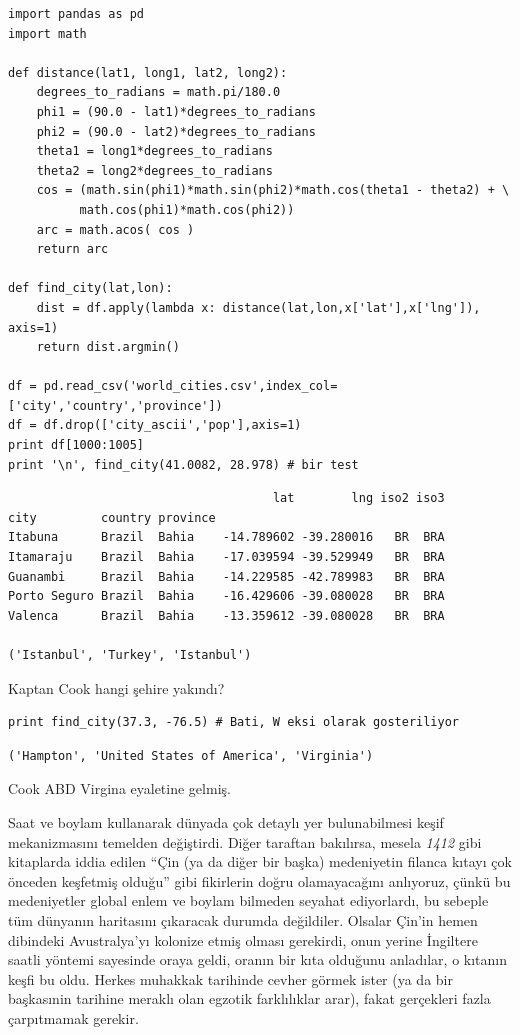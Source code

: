 \documentclass[12pt,fleqn]{article}\usepackage{../../common}
\begin{document}
\begin{verbatim}
import pandas as pd
import math

def distance(lat1, long1, lat2, long2):
    degrees_to_radians = math.pi/180.0
    phi1 = (90.0 - lat1)*degrees_to_radians
    phi2 = (90.0 - lat2)*degrees_to_radians
    theta1 = long1*degrees_to_radians
    theta2 = long2*degrees_to_radians
    cos = (math.sin(phi1)*math.sin(phi2)*math.cos(theta1 - theta2) + \
          math.cos(phi1)*math.cos(phi2)) 
    arc = math.acos( cos )
    return arc
    
def find_city(lat,lon):
    dist = df.apply(lambda x: distance(lat,lon,x['lat'],x['lng']), axis=1)
    return dist.argmin()

df = pd.read_csv('world_cities.csv',index_col=['city','country','province'])
df = df.drop(['city_ascii','pop'],axis=1)
print df[1000:1005]
print '\n', find_city(41.0082, 28.978) # bir test
\end{verbatim}

\begin{verbatim}
                                     lat        lng iso2 iso3
city         country province                                
Itabuna      Brazil  Bahia    -14.789602 -39.280016   BR  BRA
Itamaraju    Brazil  Bahia    -17.039594 -39.529949   BR  BRA
Guanambi     Brazil  Bahia    -14.229585 -42.789983   BR  BRA
Porto Seguro Brazil  Bahia    -16.429606 -39.080028   BR  BRA
Valenca      Brazil  Bahia    -13.359612 -39.080028   BR  BRA

('Istanbul', 'Turkey', 'Istanbul')
\end{verbatim}

Kaptan Cook hangi şehire yakındı? 

\begin{verbatim}
print find_city(37.3, -76.5) # Bati, W eksi olarak gosteriliyor
\end{verbatim}

\begin{verbatim}
('Hampton', 'United States of America', 'Virginia')
\end{verbatim}

Cook ABD Virgina eyaletine gelmiş.

Saat ve boylam kullanarak dünyada çok detaylı yer bulunabilmesi keşif
mekanizmasını temelden değiştirdi. Diğer taraftan bakılırsa, mesela {\em
  1412} gibi kitaplarda iddia edilen ``Çin (ya da diğer bir başka)
medeniyetin filanca kıtayı çok önceden keşfetmiş olduğu'' gibi fikirlerin
doğru olamayacağını anlıyoruz, çünkü bu medeniyetler global enlem ve boylam
bilmeden seyahat ediyorlardı, bu sebeple tüm dünyanın haritasını çıkaracak
durumda değildiler. Olsalar Çin'in hemen dibindeki Avustralya'yı kolonize
etmiş olması gerekirdi, onun yerine İngiltere saatli yöntemi sayesinde
oraya geldi, oranın bir kıta olduğunu anladılar, o kıtanın keşfi bu
oldu. Herkes muhakkak tarihinde cevher görmek ister (ya da bir başkasınin
tarihine meraklı olan egzotik farklılıklar arar), fakat gerçekleri fazla
çarpıtmamak gerekir. 
\end{document}
